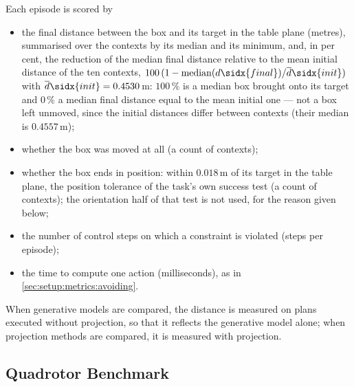 Each episode is scored by
\begin{itemize}
  \item the final distance between the box and its target in the table plane (metres), summarised over the
    contexts by its median and its minimum, and, in per cent, the reduction of the median final distance
    relative to the mean initial distance of the ten contexts,
    $100\,(1-\operatorname{median}(d\sidx{final})/\overline{d}\sidx{init})$ with
    $\overline{d}\sidx{init}=0.4530$\,m: $100\,\%$ is a median box brought onto its target and $0\,\%$ a
    median final distance equal to the mean initial one --- not a box left unmoved, since the initial
    distances differ between contexts (their median is $0.4557$\,m);
  \item whether the box was moved at all (a count of contexts);
  \item whether the box ends in position: within $0.018$\,m of its target in the table plane, the position
    tolerance of the task's own success test (a count of contexts); the orientation half of that test is not
    used, for the reason given below;
  \item the number of control steps on which a constraint is violated (steps per episode);
  \item the time to compute one action (milliseconds), as in \autoref{sec:setup:metrics:avoiding}.
\end{itemize}
When generative models are compared, the distance is measured on plans executed without projection, so
that it reflects the generative model alone; when projection methods are compared, it is measured with
projection.

\subsection{Quadrotor Benchmark}\label{sec:setup:metrics:uav}

